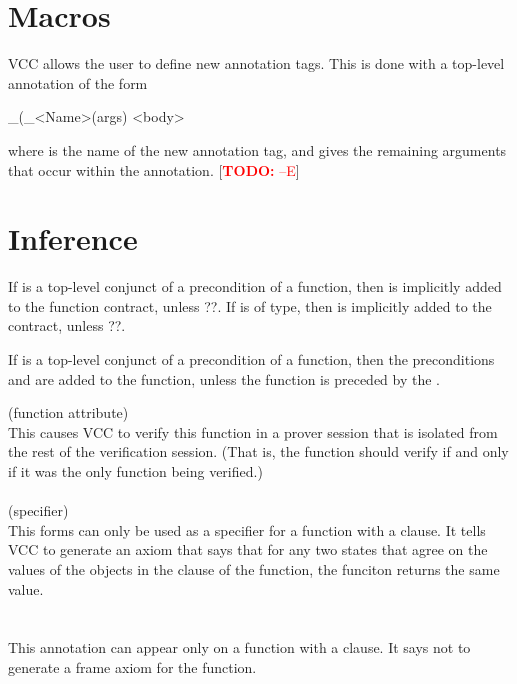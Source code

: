 \documentclass[preprint,nocopyrightspace]{sigplanconf}
\newcommand{\todo}[1]{[\textcolor{red}{\textbf{TODO:} {#1}}]}
\begin{document}
{{\section{Macros}
VCC allows the user to define new annotation tags. This is done with
a top-level annotation of the form
\begin{VCC}
_(\bool \macro_<Name>(args) {
  <body>
}
\end{VCC}
where  is the name of the new annotation tag,
and  gives the remaining arguments that occur within the
annotation. \todo{--E}

\section{Inference}

If  is a top-level conjunct of a precondition of a
function, then   is implicitly added
to the function contract, unless ??. If  is of \vcc{\claim}
type, then  is implicitly added to
the contract, unless ??.

If  is a top-level conjunct of a
precondition of a function, then the
preconditions 
and  are added to the
function, unless the function is preceded by the .


 (function attribute)\\
This causes VCC to verify this function in a prover session that is
isolated from the rest of the verification session. (That is, the
function should verify if and only if it was the only function being verified.)
\\\\
 (specifier)\\
This forms can only be used as a specifier for a   function
with a  clause. It tells VCC to generate an axiom that says
that for any two states that agree on the values of the objects in the
 clause of the function, the funciton returns the same
value.
\\\\
\\
This annotation can appear only on a  function with
a  clause. It says not to generate a frame axiom for the
function. 



}}
\end{document}
